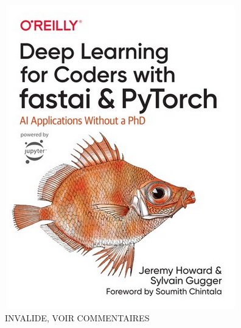 \documentclass[12pt]{article} 	%
\begin{document}
\begin{figure}[h!]
	\begin{center}
		\includegraphics[scale=1.3]{img/fastbook.png}
	\end{center}
  \caption{INVALIDE, VOIR COMMENTAIRES\cite{howard2020deep}}  %
  \label{fig:fastbook}
\end{figure}


\newpage

\end{document}

